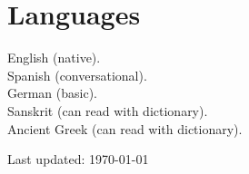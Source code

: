 \documentclass[11pt, letterpaper]{article} %
\newcommand{\years}[1]{\marginnote{\scriptsize #1}} %
\begin{document}
\section*{Languages}
\years{}English (native).\\
\years{}Spanish (conversational).\\
\years{}German (basic). \\
\years{}Sanskrit (can read with dictionary).\\
\years{}Ancient Greek (can read with dictionary).






\vfill{} %


\begin{center}
{\scriptsize Last updated: \today }
\end{center}

\end{document}
